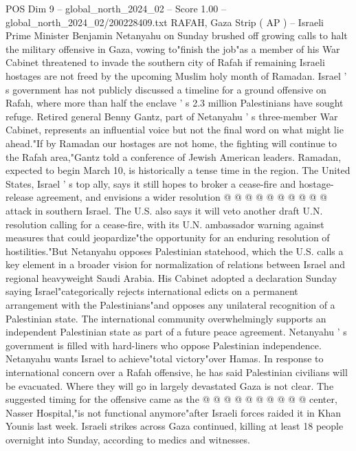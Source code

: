 \begin{textsample}{POS Dim 9 – global\_north\_2024\_02 – Score 1.00 – global\_north\_2024\_02/200228409.txt}  \label{ex:f9_pos_218}
RAFAH, Gaza Strip ( AP ) -- Israeli Prime Minister Benjamin Netanyahu on Sunday brushed off growing calls to halt the military offensive in Gaza, vowing to"finish the job"as a member of his War Cabinet threatened to invade the southern city of Rafah if remaining Israeli hostages are not freed by the upcoming Muslim holy month of Ramadan.
Israel ' s government has not publicly discussed a timeline for a ground offensive on Rafah, where more than half the enclave ' s 2.3 million Palestinians have sought refuge.
Retired general Benny Gantz, part of Netanyahu ' s three-member War Cabinet, represents an influential voice but not the final word on what might lie ahead."If by Ramadan our hostages are not home, the fighting will continue to the Rafah area,"Gantz told a conference of Jewish American leaders.
Ramadan, expected to begin March 10, is historically a tense time in the region.
The United States, Israel ' s top ally, says it still hopes to broker a cease-fire and hostage-release agreement, and envisions a wider resolution @ @ @ @ @ @ @ @ @ @ attack in southern Israel.
The U.S. also says it will veto another draft U.N. resolution calling for a cease-fire, with its U.N. ambassador warning against measures that could jeopardize"the opportunity for an enduring resolution of hostilities."But Netanyahu opposes Palestinian statehood, which the U.S. calls a key element in a broader vision for normalization of relations between Israel and regional heavyweight Saudi Arabia.
His Cabinet adopted a declaration Sunday saying Israel"categorically rejects international edicts on a permanent arrangement with the Palestinians"and opposes any unilateral recognition of a Palestinian state.
The international community overwhelmingly supports an independent Palestinian state as part of a future peace agreement.
Netanyahu ' s government is filled with hard-liners who oppose Palestinian independence.
Netanyahu wants Israel to achieve"total victory"over Hamas.
In response to international concern over a Rafah offensive, he has said Palestinian civilians will be evacuated.
Where they will go in largely devastated Gaza is not clear.
The suggested timing for the offensive came as the @ @ @ @ @ @ @ @ @ @ center, Nasser Hospital,"is not functional anymore"after Israeli forces raided it in Khan Younis last week.
Israeli strikes across Gaza continued, killing at least 18 people overnight into Sunday, according to medics and witnesses.

\end{textsample}
